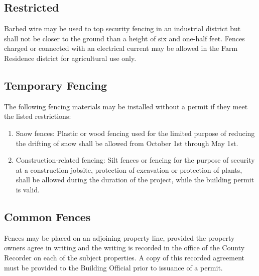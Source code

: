 \subsection{Restricted}
Barbed wire may be used to top security fencing in an industrial district but shall not be closer to the ground than a height of six and one-half feet.  Fences charged or connected with an electrical current may be allowed in the Farm Residence district for agricultural use only.
\subsection{Temporary Fencing}
The following fencing materials may be installed without a permit if they meet the listed restrictions:
\begin{enumerate}[{\indent}1)]
    \item Snow fences:  Plastic or wood fencing used for the limited purpose of reducing the drifting of snow shall be allowed from October 1st through May 1st.
    \item Construction-related fencing:  Silt fences or fencing for the purpose of security at a construction jobsite, protection of excavation or protection of plants, shall be allowed during the duration of the project, while the building permit is valid.
\end{enumerate}
\subsection{Common Fences}
Fences may be placed on an adjoining property line, provided the property owners agree in writing and the writing is recorded in the office of the County Recorder on each of the subject properties.  A copy of this recorded agreement must be provided to the Building Official prior to issuance of a permit.
